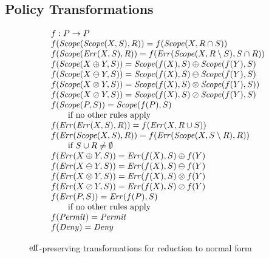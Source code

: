 \subsection{Policy Transformations}
\label{sec:transformations}

\begin{figure}[t]
\centering
\begin{footnotesize}
\[
\begin{array}{l}
  f : P   \rightarrow  P \nonumber \\
  f (\text{\textit{Scope}} (\text{\textit{Scope}} (X, S), R))  =  f (\text{\textit{Scope}} (X, R \cap S)) 
  \nonumber \\
  f (\text{\textit{Scope}} (\text{\textit{Err}} (X, S), R))  =  f (\text{\textit{Err}} (\text{\textit{Scope}} (X, R \setminus S), S \cap R)) 
  \nonumber \\
  f (\text{\textit{Scope}} (X \oplus Y, S))  =  \text{\textit{Scope}} (f (X), S) \oplus \text{\textit{Scope}} (f (Y), S) 
  \nonumber \\
  f (\text{\textit{Scope}} (X \ominus Y, S))  =  \text{\textit{Scope}} (f (X), S) \ominus \text{\textit{Scope}} (f (Y), S) 
  \nonumber \\
  f (\text{\textit{Scope}} (X \otimes Y, S))  =  \text{\textit{Scope}} (f (X), S) \otimes \text{\textit{Scope}} (f (Y), S)) 
  \nonumber \\
  f (\text{\textit{Scope}} (X \oslash Y, S))  =  \text{\textit{Scope}} (f (X), S) \oslash \text{\textit{Scope}} (f (Y), S) 
  \nonumber \\
  f (\text{\textit{Scope}} (P, S))  =  \text{\textit{Scope}} (f (P), S) \\
    \qquad  \text{if no other rules apply} \nonumber \\
  f (\text{\textit{Err}} (\text{\textit{Err}} (X, S), R))  =  f (\text{\textit{Err}} (X, R \cup S)) \nonumber \\
  f (\text{\textit{Err}} (\text{\textit{Scope}} (X, S), R))  =  f (\text{\textit{Err}} (\text{\textit{Scope}} (X, S \setminus R), R)) \\
    \qquad \text{if $S \cup R \neq \emptyset$} \nonumber \\
  f (\text{\textit{Err}} (X \oplus Y, S))   =   \text{\textit{Err}} (f (X), S) \oplus f (Y) \nonumber \\
  f (\text{\textit{Err}} (X \ominus Y, S))  =   \text{\textit{Err}} (f (X), S) \ominus f (Y) \nonumber \\
  f (\text{\textit{Err}} (X \otimes Y, S))  =   \text{\textit{Err}} (f (X), S) \otimes f (Y) \nonumber \\
  f (\text{\textit{Err}} (X \oslash Y, S))  =   \text{\textit{Err}} (f (X), S) \oslash f (Y) \nonumber \\
  f (\text{\textit{Err}} (P, S))  =  \text{\textit{Err}} (f (P), S) \\
    \qquad  \text{if no other rules apply} \nonumber \\
  f (\text{\textit{Permit}})  =  \text{\textit{Permit}} \nonumber \\
  f (\text{\textit{Deny}})  =  \text{\textit{Deny}} \nonumber
\end{array}
\]
\end{footnotesize}
\caption{$\operatorname{eff}$-preserving transformations for reduction to normal form}
\label{fig:1streduction}
\end{figure}

